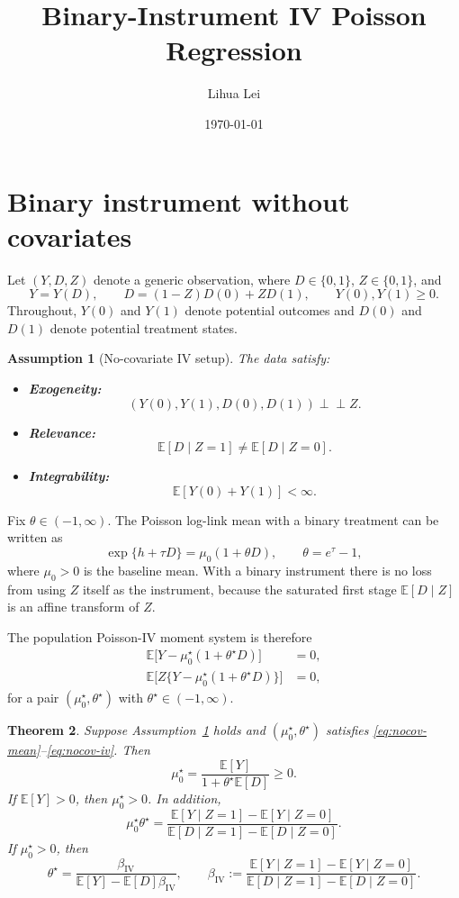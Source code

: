 \documentclass[11pt]{article}
\title{Binary-Instrument IV Poisson Regression}
\author{Lihua Lei}
\date{\today}
\numberwithin{equation}{section}
\newcommand{\E}{\mathbb E}
\newcommand{\1}{\mathbf 1}
\newcommand{\indep}{\perp\!\!\!\perp}
\newtheorem{assumption}{Assumption}[section]
\newtheorem{theorem}[assumption]{Theorem}
\theoremstyle{remark}
\begin{document}
\maketitle

\section{Binary instrument without covariates}

Let $(Y,D,Z)$ denote a generic observation, where $D \in \{0,1\}$,
$Z \in \{0,1\}$, and
\[
Y = Y(D), \qquad D = (1-Z)D(0) + ZD(1), \qquad Y(0),Y(1) \ge 0.
\]
Throughout, $Y(0)$ and $Y(1)$ denote potential outcomes and $D(0)$ and $D(1)$
denote potential treatment states.

\begin{assumption}[No-covariate IV setup]\label{ass:nocov}
The data satisfy:
\begin{itemize}
    \item[(i)] \textbf{Exogeneity:}
    \[
    (Y(0),Y(1),D(0),D(1)) \indep Z.
    \]
    \item[(ii)] \textbf{Relevance:}
    \[
    \E[D\mid Z=1] \neq \E[D\mid Z=0].
    \]
    \item[(iii)] \textbf{Integrability:}
    \[
    \E[Y(0)+Y(1)] < \infty.
    \]
\end{itemize}
\end{assumption}

Fix $\theta \in (-1,\infty)$. The Poisson log-link mean with a binary treatment can be
written as
\[
\exp\{h+\tau D\} = \mu_0(1+\theta D), \qquad \theta = e^{\tau}-1,
\]
where $\mu_0>0$ is the baseline mean. With a binary instrument there is no loss from
using $Z$ itself as the instrument, because the saturated first stage $\E[D\mid Z]$ is an
affine transform of $Z$.

The population Poisson-IV moment system is therefore
\begin{align}
\E\bigl[Y-\mu_0^\star(1+\theta^\star D)\bigr] &= 0, \label{eq:nocov-mean}\\
\E\bigl[Z\{Y-\mu_0^\star(1+\theta^\star D)\}\bigr] &= 0, \label{eq:nocov-iv}
\end{align}
for a pair $(\mu_0^\star,\theta^\star)$ with $\theta^\star \in (-1,\infty)$.

\begin{theorem}\label{thm:nocov-wald}
Suppose Assumption~\ref{ass:nocov} holds and $(\mu_0^\star,\theta^\star)$ satisfies
\eqref{eq:nocov-mean}--\eqref{eq:nocov-iv}. Then
\[
\mu_0^\star = \frac{\E[Y]}{1+\theta^\star \E[D]} \ge 0.
\]
If $\E[Y]>0$, then $\mu_0^\star>0$. In addition,
\begin{equation}\label{eq:nocov-beta}
\mu_0^\star\theta^\star
= \frac{\E[Y\mid Z=1]-\E[Y\mid Z=0]}{\E[D\mid Z=1]-\E[D\mid Z=0]}.
\end{equation}
If $\mu_0^\star>0$, then
\begin{equation}\label{eq:nocov-theta}
\theta^\star
= \frac{\beta_{\mathrm{IV}}}{\E[Y]-\E[D]\beta_{\mathrm{IV}}},
\qquad
\beta_{\mathrm{IV}}
:= \frac{\E[Y\mid Z=1]-\E[Y\mid Z=0]}{\E[D\mid Z=1]-\E[D\mid Z=0]}.
\end{equation}
\end{theorem}
\end{document}
